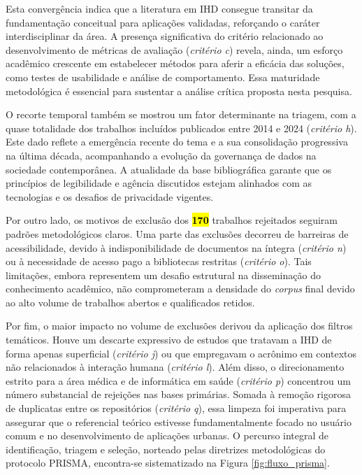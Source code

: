 \documentclass[
	12pt,				%
	oneside,			%
	a4paper,			%
	english,			%
	brazil				%
	]{abntex2ppgsi}
\begin{document}
Esta convergência indica que a literatura em IHD consegue transitar da fundamentação conceitual para aplicações validadas, reforçando o caráter interdisciplinar da área. A presença significativa do critério relacionado ao desenvolvimento de métricas de avaliação (\textit{critério c}) revela, ainda, um esforço acadêmico crescente em estabelecer métodos para aferir a eficácia das soluções, como testes de usabilidade e análise de comportamento. Essa maturidade metodológica é essencial para sustentar a análise crítica proposta nesta pesquisa.

O recorte temporal também se mostrou um fator determinante na triagem, com a quase totalidade dos trabalhos incluídos publicados entre 2014 e 2024 (\textit{critério h}). Este dado reflete a emergência recente do tema e a sua consolidação progressiva na última década, acompanhando a evolução da governança de dados na sociedade contemporânea. A atualidade da base bibliográfica garante que os princípios de legibilidade e agência discutidos estejam alinhados com as tecnologias e os desafios de privacidade vigentes.

Por outro lado, os motivos de exclusão dos \hl{\textbf{170}} trabalhos rejeitados seguiram padrões metodológicos claros. Uma parte das exclusões decorreu de barreiras de acessibilidade, devido à indisponibilidade de documentos na íntegra (\textit{critério n}) ou à necessidade de acesso pago a bibliotecas restritas (\textit{critério o}). Tais limitações, embora representem um desafio estrutural na disseminação do conhecimento acadêmico, não comprometeram a densidade do \textit{corpus} final devido ao alto volume de trabalhos abertos e qualificados retidos.

Por fim, o maior impacto no volume de exclusões derivou da aplicação dos filtros temáticos. Houve um descarte expressivo de estudos que tratavam a IHD de forma apenas superficial (\textit{critério j}) ou que empregavam o acrônimo em contextos não relacionados à interação humana (\textit{critério l}). Além disso, o direcionamento estrito para a área médica e de informática em saúde (\textit{critério p}) concentrou um número substancial de rejeições nas bases primárias. Somada à remoção rigorosa de duplicatas entre os repositórios (\textit{critério q}), essa limpeza foi imperativa para assegurar que o referencial teórico estivesse fundamentalmente focado no usuário comum e no desenvolvimento de aplicações urbanas. O percurso integral de identificação, triagem e seleção, norteado pelas diretrizes metodológicas do protocolo PRISMA, encontra-se sistematizado na Figura \ref{fig:fluxo_prisma}.
\end{document}
